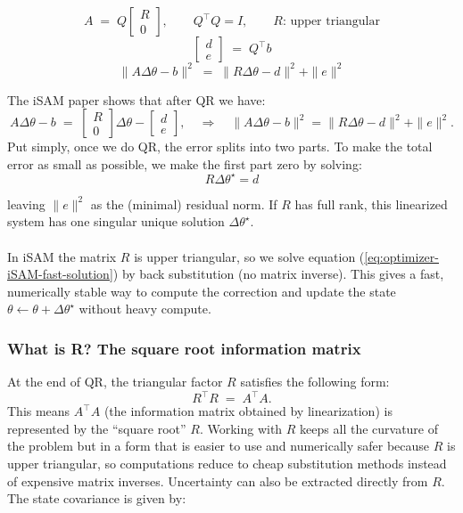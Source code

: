 $$
    A \;=\; Q
    \begin{bmatrix}
    R\\[2pt]
    0
    \end{bmatrix},
    \qquad Q^\top Q = I,
    \qquad R \text{: upper triangular}
$$
$$
    \begin{bmatrix}
    d\\ e
    \end{bmatrix}
    \;=\;
    Q^\top b
$$
$$
    \|A\Delta\theta - b\|^2
    \;=\;
    \|R\Delta\theta - d\|^2 + \|e\|^2
$$

\noindent
The \gls{iSAM} paper \cite{iSAM_paper} shows that after QR we have:
$$
    A\Delta\theta - b \;=\;
    \begin{bmatrix} R \\ 0 \end{bmatrix}\Delta\theta -
    \begin{bmatrix} d \\ e \end{bmatrix},
    \quad\Rightarrow\quad
    \|A\Delta\theta - b\|^2 = \|R\Delta\theta - d\|^2 + \|e\|^2.
$$
\noindent
Put simply, once we do QR, the error splits into two parts. To make the total error as small as possible, we make the first part zero by solving:
\begin{equation}
    R\Delta\theta^\star = d
    \label{eq:optimizer-iSAM-fast-solution}
\end{equation}

\noindent
leaving $\|e\|^2$ as the (minimal) residual norm. If $R$ has full rank, this linearized system has one singular unique solution $\Delta\theta^\star$.
\\ \\
In \gls{iSAM} the matrix $R$ is upper triangular, so we solve equation (\ref{eq:optimizer-iSAM-fast-solution}) by back substitution (no matrix inverse). This gives a fast, numerically stable way to compute the correction and update the state $\theta \leftarrow \theta + \Delta\theta^\star$ without heavy compute.



\subsubsection{What is R? The square root information matrix}
At the end of QR, the triangular factor $R$ satisfies the following form:
$$
R^\top R \;=\; A^\top A .
$$
This means $A^\top A$ (the information matrix obtained by linearization) is represented by the ``square root'' $R$. Working with $R$ keeps all the curvature of the problem but in a form that is easier to use and numerically safer because $R$ is upper triangular, so computations reduce to cheap substitution methods instead of expensive matrix inverses. Uncertainty can also be extracted directly from $R$. The state covariance is given by:

